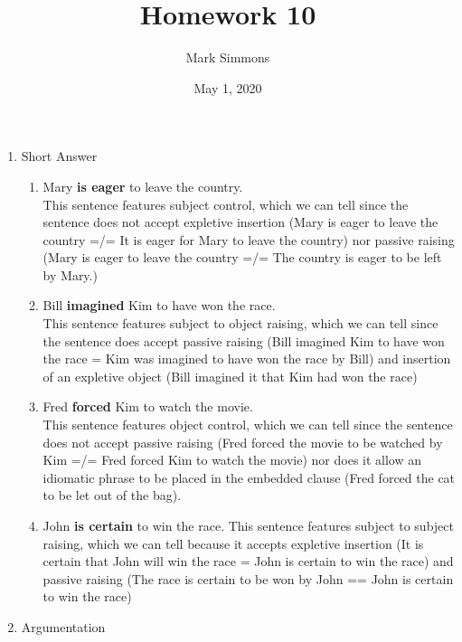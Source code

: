 \documentclass[a4paper, 11pt]{article}
\title{Homework 10}
\author{Mark Simmons}
\date{May 1, 2020}
\begin{document}
\maketitle



\begin{enumerate}[label=\textbf{\arabic*.}]

\item Short Answer

\begin{enumerate}[label=(\alph*)]

\item Mary \textbf{is eager} to leave the country.\\
  This sentence features subject control, which we can tell since the sentence does not accept expletive
  insertion 
  (Mary is eager to leave the country =/= It is eager for Mary to leave the country)
  nor passive raising
  (Mary is eager to leave the country =/= The country is eager to be left by Mary.)

  \item Bill \textbf{imagined} Kim to have won the race.\\
  This sentence features subject to object raising, which we can tell since the sentence does accept
  passive raising
  (Bill imagined Kim to have won the race = Kim was imagined to have won the race by Bill)
  and insertion of an expletive object
  (Bill imagined it that Kim had won the race)

  \item Fred \textbf{forced} Kim to watch the movie.\\
  This sentence features object control, which we can tell since the sentence does not accept
  passive raising
  (Fred forced the movie to be watched by Kim =/= Fred forced Kim to watch the movie)
  nor does it allow an idiomatic phrase to be placed in the embedded clause
  (Fred forced the cat to be let out of the bag).

  \item John \textbf{is certain} to win the race.
  This sentence features subject to subject raising, which we can tell because it accepts expletive insertion
  (It is certain that John will win the race = John is certain to win the race) and passive raising
  (The race is certain to be won by John == John is certain to win the race)

\end{enumerate}

\item Argumentation


\end{enumerate}
\end{document}
